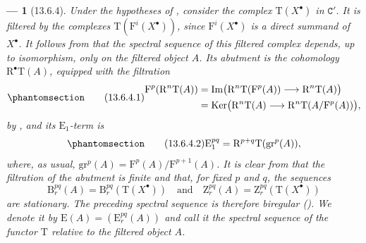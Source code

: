 \documentclass[oneside]{amsart}
\theoremstyle{ega-env-style}
\newtheorem*{env}{---}
\theoremstyle{ega-thm-env-style}
\theoremstyle{ega-defn-env-style}
\def\cat{\mathtt}                   %
\def\RR{\mathrm{R}}                 %
\def\Ker{\operatorname{Ker}}
\def\Im{\operatorname{Im}}
\newcommand{\oldpage}[2][]{{\marginnote{\normalfont{\textbf{#1}~|~#2}}}\ignorespaces}
\let\EGAOriginalLabel\label
\renewcommand{\label}[1]{\phantomsection\EGAOriginalLabel{#1}}
\begin{document}
\begin{env}[13.6.4]
\label{0.13.6.4}
Under the hypotheses of , consider the complex
$\mathrm{T}(X^\bullet)$ in $\cat{C}'$.
It is filtered by the complexes
$\mathrm{T}(\mathrm{F}^i(X^\bullet))$, since
$\mathrm{F}^i(X^\bullet)$ is a direct summand of $X^\bullet$.
It follows from  that the \emph{spectral sequence} of
this filtered complex depends, up to isomorphism, only on the
filtered object $A$.
Its abutment is the cohomology $\RR^\bullet\mathrm{T}(A)$, equipped
with the filtration
\begin{equation}
\label{0.13.6.4.1}
\tag{13.6.4.1}
  \begin{split}
  \mathrm{F}^p(\RR^n\mathrm{T}(A))
  &=
  \Im\bigl(
    \RR^n\mathrm{T}(\mathrm{F}^p(A))
    \longrightarrow
    \RR^n\mathrm{T}(A)
  \bigr)
  \\
  &=
  \Ker\bigl(
    \RR^n\mathrm{T}(A)
    \longrightarrow
    \RR^n\mathrm{T}(A/\mathrm{F}^p(A))
  \bigr),
  \end{split}
\end{equation}
by , and its $\mathrm{E}_1$-term is
\begin{equation}
\label{0.13.6.4.2}
\tag{13.6.4.2}
  \mathrm{E}_1^{pq}
  =
  \RR^{p+q}\mathrm{T}(\mathrm{gr}^p(A)),
\end{equation}
where, as usual,
$\mathrm{gr}^p(A)=\mathrm{F}^p(A)/\mathrm{F}^{p+1}(A)$.
It is clear from  that the filtration of the abutment
is finite and that, for fixed $p$ and $q$, the sequences
\oldpage[0\textsubscript{III}]{74}
\[
  \mathrm{B}_r^{pq}(A)
  =
  \mathrm{B}_r^{pq}(\mathrm{T}(X^\bullet))
  \quad\text{and}\quad
  \mathrm{Z}_r^{pq}(A)
  =
  \mathrm{Z}_r^{pq}(\mathrm{T}(X^\bullet))
\]
are stationary.
The preceding spectral sequence is therefore \emph{biregular}
().
We denote it by
$\mathrm{E}(A)=(\mathrm{E}_r^{pq}(A))$ and call it the
\emph{spectral sequence of the functor $\mathrm{T}$ relative to the
filtered object $A$}.
\end{env}
\end{document}
